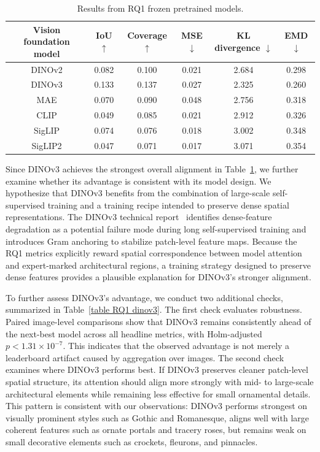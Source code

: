 \documentclass[lineno,pdflatex,sn-mathphys-num]{sn-jnl}%
\theoremstyle{thmstyleone}%
\theoremstyle{thmstyletwo}%
\theoremstyle{thmstylethree}%
\begin{document}
\begin{table}[!h]
\centering
\caption{Results from RQ1 frozen pretrained models.\label{table RQ1 result}}
\begin{tabular}{cccccc}
\toprule
Vision foundation model & IoU $\uparrow$ & Coverage $\uparrow$ & MSE $\downarrow$ & KL divergence $\downarrow$ & EMD $\downarrow$ \\ \midrule
DINOv2    & 0.082 & 0.100 & 0.021 & 2.684 & 0.298 \\
DINOv3     & 0.133 & 0.137 & 0.027 & 2.325 & 0.260 \\
MAE        & 0.070 & 0.090 & 0.048 & 2.756 & 0.318 \\
CLIP      & 0.049 & 0.085 & 0.021 & 2.912 & 0.326 \\
SigLIP    & 0.074 & 0.076 & 0.018 & 3.002 & 0.348 \\
SigLIP2   & 0.047 & 0.071 & 0.017 & 3.071 & 0.354 \\ \bottomrule
\end{tabular}
\end{table}

Since DINOv3 achieves the strongest overall alignment in Table~\ref{table RQ1 result}, we further examine whether its advantage is consistent with its model design. We hypothesize that DINOv3 benefits from the combination of large-scale self-supervised training and a training recipe intended to preserve dense spatial representations. The DINOv3 technical report~\cite{Simeoni26DINOv3} identifies dense-feature degradation as a potential failure mode during long self-supervised training and introduces Gram anchoring to stabilize patch-level feature maps. Because the RQ1 metrics explicitly reward spatial correspondence between model attention and expert-marked architectural regions, a training strategy designed to preserve dense features provides a plausible explanation for DINOv3's stronger alignment.

To further assess DINOv3's advantage, we conduct two additional checks, summarized in Table~\ref{table RQ1 dinov3}. The first check evaluates robustness. Paired image-level comparisons show that DINOv3 remains consistently ahead of the next-best model across all headline metrics, with Holm-adjusted $p < 1.31 \times 10^{-7}$. This indicates that the observed advantage is not merely a leaderboard artifact caused by aggregation over images. The second check examines where DINOv3 performs best. If DINOv3 preserves cleaner patch-level spatial structure, its attention should align more strongly with mid- to large-scale architectural elements while remaining less effective for small ornamental details. This pattern is consistent with our observations: DINOv3 performs strongest on visually prominent styles such as Gothic and Romanesque, aligns well with large coherent features such as ornate portals and tracery roses, but remains weak on small decorative elements such as crockets, fleurons, and pinnacles.
\end{document}

